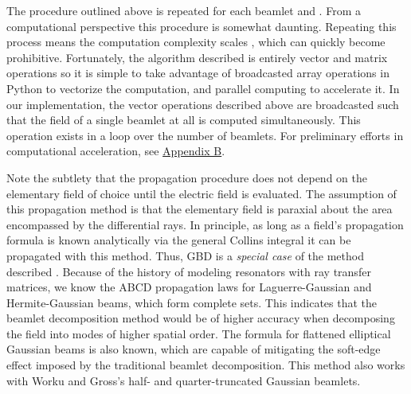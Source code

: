 The procedure outlined above is repeated for each beamlet and . From a computational perspective this procedure is somewhat daunting. Repeating this process means the computation complexity scales , which can quickly become prohibitive. Fortunately, the algorithm described is entirely vector and matrix operations so it is simple to take advantage of broadcasted array operations in Python to vectorize the computation, and parallel computing to accelerate it. In our implementation, the vector operations described above are broadcasted such that the field of a single beamlet at all  is computed simultaneously. This operation exists in a loop over the number of beamlets. For  preliminary efforts in computational acceleration, see \hyperref[sec:appendixB]{Appendix B}.

 Note the subtlety that the propagation procedure does not depend on the elementary field of choice until the electric field is evaluated. The assumption of this propagation method is that the elementary field is paraxial about the area encompassed by the differential rays. In principle, as long as a field's propagation formula is known analytically via the general Collins integral it can be propagated with this method. Thus, GBD is a \emph{special case} of the method described . Because of the history of modeling resonators with ray transfer matrices, we know the ABCD propagation laws for Laguerre-Gaussian\cite{Mei_2005} and Hermite-Gaussian\cite{CAI2002139} beams, which form complete sets. This indicates that the beamlet decomposition method would be of higher accuracy when decomposing the field into modes of higher spatial order. The formula for flattened elliptical Gaussian beams is also known\cite{CAI2002139}, which are capable of mitigating the soft-edge effect imposed by the traditional beamlet decomposition\cite{greynolds_ten_2020}. This method also works with Worku and Gross's half- and quarter-truncated Gaussian beamlets\cite{Worku19}. 

